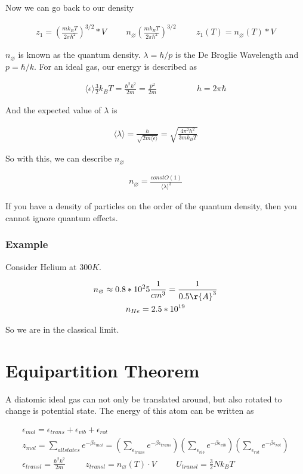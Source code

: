 \documentclass[fleqn]{report}
\newcommand{\hp}{\hspace{1cm}}
\newcommand{\equations} [1] {
\begin{gather*}
#1
\end{gather*}
}
\begin{document}
Now we can go back to our density 

\equations{
    z_1 
    =
    \left(
        \frac{m k_B T}{2 \pi \hbar^2}
    \right)^{3/2}
    * V
    \hp 
    n_{\varnothing}
    \left(
        \frac{m k_B T}{2 \pi \hbar^2}
    \right)^{3/2}
    \hp
    z_1(T)
    =
    n_{\varnothing}(T)
    * V
}

$n_{\varnothing}$ is known as the quantum density. $\lambda = h/p$ is the 
De Broglie Wavelength and $p = \hbar / k$. For an ideal gas, our energy 
is described as
\equations{
    \langle \epsilon \rangle
    \frac{3}{2} k_B T 
    =
    \frac{\hbar^2 k^2}{2m}
    =
    \frac{p^2}{2m}
    \hp \hp 
    h 
    =
    2 \pi \hbar
}

And the expected value of $\lambda$ is 
\equations{
    \langle \lambda \rangle 
    =
    \frac{h}{\sqrt{2 m \langle \epsilon \rangle}}
    =
    \sqrt{
        \frac{4 \pi^2 \hbar^2}{3 m k_B T}
    }
}

So with this, we can describe $n_\varnothing$ 
\equations{
    n_{\varnothing}
    =
    \frac{const O(1)}{\langle \lambda \rangle^3}
}

If you have a density of particles on the order of the quantum density, then 
you cannot ignore quantum effects.

\subsection{Example}
Consider Helium at $300K$. 

\equations{
    n_{\varnothing}
    \approx 
    0.8 * 10^25 \frac{1}{cm^3}
    =
    \frac{1}{0.5 \r{A}^3}
    \\
    n_{He}
    =
    2.5 * 10^{19}
}
So we are in the classical limit.

\chapter{Equipartition Theorem}
A diatomic ideal gas can not only be translated around, but also rotated to 
change is potential state. The energy of this atom can be written as 
\equations{
    \epsilon_{mol}
    =
    \epsilon_{trans}
    +
    \epsilon_{vib}
    +
    \epsilon_{rot}
    \\
    z_{mol}
    =
    \sum_{all states}
    e^{- \beta \epsilon_{mol}}
    =
    \left(
        \sum_{\epsilon_{trans}}
        e^{- \beta \epsilon_{trans}}
    \right)
    \left(
        \sum_{\epsilon_{vib}}
        e^{- \beta \epsilon_{vib}}
    \right)
    \left(
        \sum_{\epsilon_{rot}}
        e^{- \beta \epsilon_{rot}}
    \right)
    \\
    \epsilon_{transl}
    =
    \frac{\hbar^2 k^2}{2m}
    \hp 
    z_{transl}
    =
    n_{\varnothing}(T) \cdot V 
    \hp 
    U_{transl}
    =
    \frac{3}{2} N k_B T
}
\end{document}
